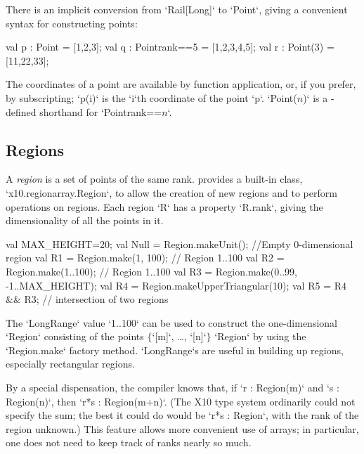 There is an implicit conversion from \xcd`Rail[Long]` to 
\xcd`Point`, giving
a convenient syntax for constructing points: 

\begin{xten}
val p : Point = [1,2,3];
val q : Point{rank==5} = [1,2,3,4,5];
val r : Point(3) = [11,22,33];
\end{xten}

The coordinates of a point are available by function application, or, if you
prefer, by subscripting; \xcd`p(i)` is the
\xcd`i`th coordinate of the point \xcd`p`. 
\xcdmath`Point($n$)` is a -defined shorthand  for 
\xcdmath`Point{rank==$n$}`.


\subsection{Regions}\label{XtenRegions}

A {\em region} is a set of points of the same rank.  {}\Xten{}
provides a built-in class, \xcd`x10.regionarray.Region`, to allow the
creation of new regions and to perform operations on regions. 
Each region \xcd`R` has a property \xcd`R.rank`, giving the dimensionality of
all the points in it.

\begin{ex}
\begin{xten}
val MAX_HEIGHT=20;
val Null = Region.makeUnit(); //Empty 0-dimensional region
val R1 = Region.make(1, 100); // Region 1..100
val R2 = Region.make(1..100);  // Region 1..100
val R3 = Region.make(0..99, -1..MAX_HEIGHT);
val R4 = Region.makeUpperTriangular(10);
val R5 = R4 && R3; // intersection of two regions
\end{xten}

The \xcd`LongRange` value \xcd`1..100` can be used to construct
the one-dimensional \xcd`Region` consisting of the points
$\{$\xcdmath`[m]`, \dots, \xcdmath`[n]`$\}$
\xcd`Region` by using the \xcd`Region.make` factory method.  
\xcd`LongRange`s are useful in building up regions, especially rectangular regions.  
\end{ex}

By a special dispensation, the compiler knows that, if \xcd`r : Region(m)` and
\xcd`s : Region(n)`, then \xcd`r*s : Region(m+n)`.  (The X10 type system
ordinarily could not specify the sum; the best it could do 
would be \xcd`r*s : Region`, with the rank of the region unknown.)  This
feature allows more convenient use of arrays; in particular, one does not need
to keep track of ranks nearly so much.

